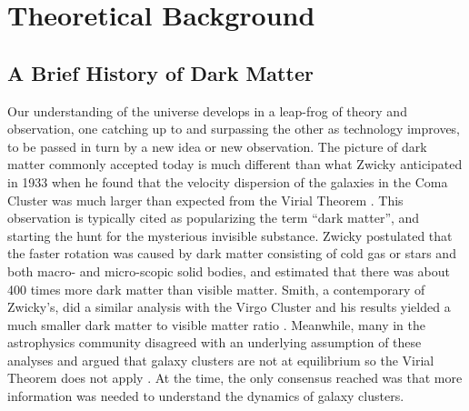 \chapter{Theoretical Background }
\label{ch:theory} %


\section{A Brief History of Dark Matter}
Our understanding of the universe develops in a leap-frog of theory and observation, one catching up to and surpassing the other as technology improves, to be passed in turn by a new idea or new observation. The picture of dark matter commonly accepted today is much different than what Zwicky anticipated in 1933 when he found that the velocity dispersion of the galaxies in the Coma Cluster was much larger than expected from the Virial Theorem \cite{Zwicky1933}. This observation is typically cited as popularizing the term ``dark matter'', and starting the hunt for the mysterious invisible substance. Zwicky postulated that the faster rotation was caused by dark matter consisting of cold gas or stars and both macro- and micro-scopic solid bodies, and estimated that there was about 400 times more dark matter than visible matter. Smith, a contemporary of Zwicky's, did a similar analysis with the Virgo Cluster and his results yielded a much smaller dark matter to visible matter ratio \cite{Bertone2016}. Meanwhile, many in the astrophysics community disagreed with an underlying assumption of these analyses and argued that galaxy clusters are not at equilibrium so the Virial Theorem does not apply \cite{Bertone2016}. At the time, the only consensus reached was that more information was needed to understand the dynamics of galaxy clusters. 

